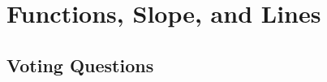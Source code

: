 \section{Functions, Slope, and Lines} \label{S:0.1.Functions}


\newpage

\newpage

\newpage

\newpage

\newpage

\newpage
\subsection*{Voting Questions}

\newpage
